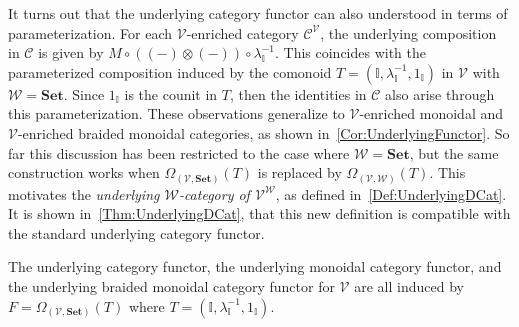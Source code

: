 It turns out that the underlying category functor can also understood in terms of parameterization.
For each $\mathcal{V}$-enriched category $\mathcal{C}^{\mathcal{V}}$, the underlying composition in $\mathcal{C}$ is given by $M \circ ( ( - ) \otimes ( - ) ) \circ \lambda_{\mathbb{I}}^{-1}$.
This coincides with the parameterized composition induced by the comonoid $T = ( \mathbb{I}, \lambda_{\mathbb{I}}^{-1}, 1_{\mathbb{I}} )$ in $\mathcal{V}$ with $\mathcal{W} = \mathbf{Set}$.
Since $1_{\mathbb{I}}$ is the counit in $T$, then the identities in $\mathcal{C}$ also arise through this parameterization.
These observations generalize to $\mathcal{V}$-enriched monoidal and $\mathcal{V}$-enriched braided monoidal categories, as shown in~\cref{Cor:UnderlyingFunctor}.
So far this discussion has been restricted to the case where $\mathcal{W} = \mathbf{Set}$, but the same construction works when $\Omega_{(\mathcal{V},\mathbf{Set})}( T )$ is replaced by $\Omega_{(\mathcal{V},\mathcal{W})}( T )$.
This motivates the \emph{underlying $\mathcal{W}$-category of $\mathcal{V}^{\mathcal{W}}$}, as defined in~\cref{Def:UnderlyingDCat}.
It is shown in~\cref{Thm:UnderlyingDCat}, that this new definition is compatible with the standard underlying category functor.

\begin{cor}
    \label{Cor:UnderlyingFunctor}
    The underlying category functor, the underlying monoidal category functor, and the underlying braided monoidal category functor for $\mathcal{V}$ are all induced by $F = \Omega_{(\mathcal{V},\mathbf{Set})}( T )$ where $T = ( \mathbb{I}, \lambda_{\mathbb{I}}^{-1}, 1_{\mathbb{I}} )$.
\end{cor}

